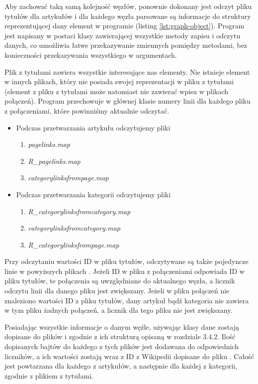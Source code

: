 Aby zachować taką samą kolejność węzłów, ponownie dokonany jest odczyt pliku tytułów dla artykułów i dla każdego węzła parsowane są informacje do struktury reprezentującej dany element w programie (listing \ref{lst:graph-object}). Program jest napisany w postaci klasy zawierającej wszystkie metody zapisu i odczytu danych, co umożliwia łatwe przekazywanie zmiennych pomiędzy metodami, bez konieczności przekazywania wszystkiego w argumentach.

Plik z tytułami zawiera wszystkie interesujące nas elementy. Nie istnieje element w innych plikach, który nie posiada swojej reprezentacji w pliku z tytułami (element z pliku z tytułami może natomiast nie zawierać wpisu w plikach połączeń). Program przechowuje w głównej klasie numery linii dla każdego pliku z połączeniami, które powinniśmy aktualnie odczytać.

\begin{itemize}
\item Podczas przetwarzania artykułu odczytujemy pliki
\begin{enumerate}[label=\textbullet]
    \item  \textit{pagelinks.map}
    \item  \textit{R\_pagelinks.map}
    \item  \textit{categorylinksfrompage.map}
\end{enumerate}
\item Podczas przetwarzania kategorii odczytujemy pliki
\begin{enumerate}[label=\textbullet]
    \item  \textit{R\_categorylinksfromcategory.map}
    \item  \textit{categorylinksfromcategory.map}
    \item  \textit{R\_categorylinksfrompage.map}
\end{enumerate}
\end{itemize}

Przy odczytaniu wartości ID w pliku tytułów, odczytywane są także pojedyncze linie w powyższych plikach . Jeżeli ID w pliku z połączeniami odpowiada ID w pliku tytułów, te połączenia są uwzględniane do aktualnego węzła, a licznik odczytu linii dla danego pliku jest zwiększany. Jeżeli w pliku połączeń nie znaleziono wartości ID z pliku tytułów, dany artykuł bądź kategoria nie zawiera w tym pliku  żadnych połączeń, a licznik dla tego pliku nie jest zwiększany.

Posiadając wszystkie informacje o danym węźle, używając klasy  dane zostają dopisane do plików  i  zgodnie z ich strukturą opisaną w rozdziale 3.4.2. Ilość dopisanych bajtów do każdego z tych plików jest dodawana do odpowiednich liczników, a ich wartości zostają wraz z ID z Wikipedii dopisane do pliku . Całość jest powtarzana dla każdego z artykułów, a następnie dla każdej z kategorii, zgodnie z plikiem z tytułami.

